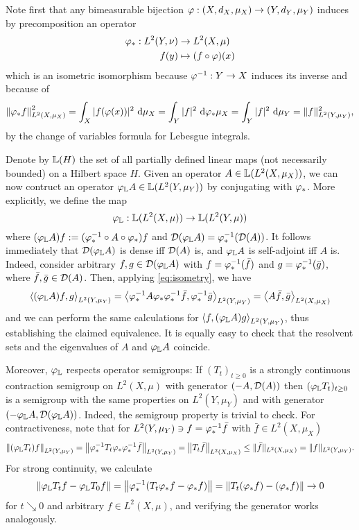 Note first that any bimeasurable bijection $\varphi:(X,d_X,\mu_X)\to(Y,d_Y,\mu_Y)$ induces by precomposition an operator
\begin{align*}
  \varphi_*:L^2(Y,\nu)&\to L^2(X,\mu)\\
  f(y)&\mapsto(f\circ\varphi)(x)
\end{align*}
which is an isometric isomorphism because $\varphi^{-1}:Y\to X$ induces its inverse and because of
\begin{equation}\label{eq:isometry}
  \left\|\varphi_*f\right\|_{L^2(X,\mu_X)}^2
  =\int_X |f(\varphi(x))|^2\,\operatorname{d}\!\mu_X
  =\int_Y |f|^2\,\operatorname{d}\!\varphi_*\mu_X
  =\int_Y |f|^2\,\operatorname{d}\!\mu_Y
  =\|f\|_{L^2(Y,\mu_Y)}^2,
\end{equation}
by the change of variables formula for Lebesgue integrals. 

Denote by $\mathbb{L}(H)$ the set of all partially defined linear maps (not necessarily bounded) on a Hilbert space $H$. Given an operator $A\in\mathbb{L}(L^2(X,\mu_X))$, we can now contruct an operator $\varphi_{\mathbb{L}} A\in\mathbb{L}(L^2(Y,\mu_Y))$ by conjugating with $\varphi_*$. More explicitly, we define the map
\[
  \varphi_{\mathbb{L}}:\mathbb{L}(L^2(X,\mu))\to\mathbb{L}(L^2(Y,\mu))
\]
where $(\varphi_{\mathbb{L}} A)f:=(\varphi_*^{-1}\circ A\circ\varphi_*)f$ and $\mathcal{D}(\varphi_{\mathbb{L}} A)=\varphi_*^{-1}(\mathcal{D}(A))$. It follows immediately that $\mathcal{D}(\varphi_{\mathbb{L}} A)$ is dense iff $\mathcal{D}(A)$ is, and $\varphi_{\mathbb{L}} A$ is self-adjoint iff $A$ is. Indeed, consider arbitrary $f,g\in\mathcal{D}(\varphi_{\mathbb{L}} A)$ with $f=\varphi_*^{-1}(\bar f)$ and $g=\varphi_*^{-1}(\bar g)$, where $\bar f, \bar g\in \mathcal{D}(A)$. Then, applying \eqref{eq:isometry}, we have
\[
  \left<(\varphi_{\mathbb{L}} A)f,g\right>_{L^2(Y,\mu_Y)}
  =\left<\varphi_*^{-1}A\varphi_*\varphi_*^{-1}\bar f,\varphi_*^{-1}\bar g\right>_{L^2(Y,\mu_Y)}
  =\left<A\bar f,\bar g\right>_{L^2(X,\mu_X)}
\]
and we can perform the same calculations for $\left<f,(\varphi_{\mathbb{L}} A)g\right>_{L^2(Y,\mu_Y)}$, thus establishing the claimed equivalence. It is equally easy to check that the resolvent sets and the eigenvalues of $A$ and $\varphi_{\mathbb{L}} A$ coincide.

Moreover, $\varphi_{\mathbb{L}}$ respects operator semigroups: If $(T_t)_{t\geq0}$ is a strongly continuous contraction semigroup on $L^2(X,\mu)$ with generator $(-A,\mathcal{D}(A))$ then $(\varphi_{\mathbb{L}} T_t)_{t\geq0}$ is a semigroup with the same properties on $L^2(Y,\mu_Y)$ and with generator $(-\varphi_{\mathbb{L}} A,\mathcal{D}(\varphi_{\mathbb{L}} A))$. Indeed, the semigroup property is trivial to check. For contractiveness, note that for $L^2(Y,\mu_Y)\ni f=\varphi_*^{-1}\bar f$ with 
$\bar f\in L^2(X,\mu_X)$
\[
  \left\|(\varphi_{\mathbb{L}}T_t)f\right\|_{L^2(Y,\mu_Y)}
  =\left\|\varphi_*^{-1}T_t\varphi_*\varphi_*^{-1}\bar f\right\|_{L^2(Y,\mu_Y)}
  =\left\|T_t\bar f\right\|_{L^2(X,\mu_X)}
  \leq\|\bar f\|_{L^2(X,\mu_X)}=\|f\|_{L^2(Y,\mu_Y)}.
\]
For strong continuity, we calculate
\[
  \left\|\varphi_{\mathbb{L}} T_t f-\varphi_{\mathbb{L}} T_0 f\right\|
  =\left\|\varphi_*^{-1}(T_t\varphi_*f-\varphi_*f)\right\|
  =\left\|T_t(\varphi_*f)-(\varphi_*f)\right\| \to 0
\]
for $t\searrow 0$ and arbitrary $f\in L^2(X,\mu)$, and verifying the generator works analogously. 

